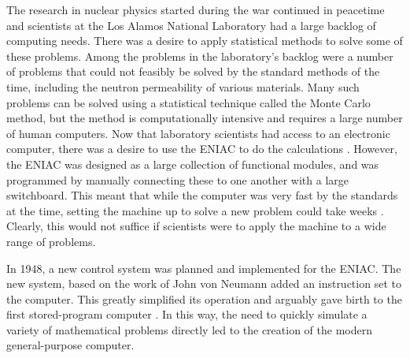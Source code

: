 \documentclass[../../main.tex]{subfiles}
\begin{document}
The research in nuclear physics started during the war continued in peacetime and scientists at the Los Alamos National Laboratory had a large backlog of computing needs.
There was a desire to apply statistical methods to solve some of these problems.
Among the problems in the laboratory's backlog were a number of problems that could not feasibly be solved by the standard methods of the time, including the neutron permeability of various materials.
Many such problems can be solved using a statistical technique called the Monte Carlo method, but the method is computationally intensive and requires a large number of human computers.
Now that laboratory scientists had access to an electronic computer, there was a desire to use the ENIAC to do the calculations \cite{Haigh2014}.
However, the ENIAC was designed as a large collection of functional modules, and was programmed by manually connecting these to one another with a large switchboard.
This meant that while the computer was very fast by the standards at the time, setting the machine up to solve a new problem could take weeks \cite{Rope2007}.
Clearly, this would not suffice if scientists were to apply the machine to a wide range of problems.

In 1948, a new control system was planned and implemented for the ENIAC.
The new system, based on the work of John von Neumann \cite{VonNeumann1993} \cite{Haigh2014a} added an instruction set to the computer.
This greatly simplified its operation and arguably gave birth to the first stored-program computer \cite{Rope2007}.
In this way, the need to quickly simulate a variety of mathematical problems directly led to the creation of the modern general-purpose computer.
\end{document}
